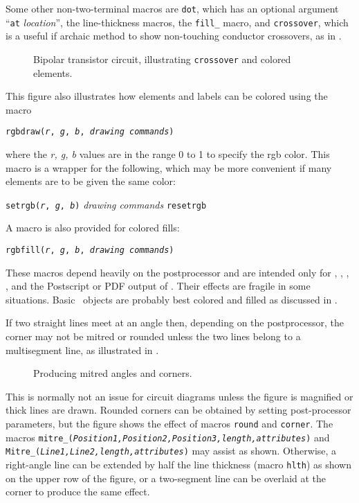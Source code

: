 \pagebreak
Some other non-two-terminal macros are {\tt dot}, which has an
optional argument ``{\tt at} {\sl location}'', the line-thickness
macros, the {\tt fill\_} macro, and {\tt crossover}, which is a useful if
archaic method to show non-touching conductor crossovers, as in
.
\begin{figure}[H]
   
   \caption{Bipolar transistor circuit, illustrating {\tt crossover}
      and colored elements.}
   \label{bistable}
   \end{figure}

This figure also illustrates how elements and labels can be colored
using the macro
\par
{\tt rgbdraw({\sl r}, {\sl g}, {\sl b}, {\sl drawing commands})}
\par
\noindent
where the {\sl r, g, b} values are in the range 0 to 1
to specify the rgb color.
This macro is a wrapper for the following, which may be more convenient
if many elements are to be given the same color:

   {\tt setrgb({\sl r}, {\sl g}, {\sl b})}
      \hfill\break\hspace*{\parindent}%
   {\sl drawing commands}
      \hfill\break\hspace*{\parindent}%
   {\tt resetrgb}

A macro is also provided for colored fills:

{\tt rgbfill({\sl r}, {\sl g}, {\sl b}, {\sl drawing commands})}

\noindent%
These macros depend heavily on the postprocessor and are intended only for 
\PSTricks, \TPGF, \MetaPost, \SVG, and the Postscript or PDF output of \dpic.
Their effects are fragile in some situations.
Basic \Pic\ objects are probably best colored and filled as discussed
in .

%
If two straight lines meet at an angle then, depending on the postprocessor,
the corner may not be mitred or rounded unless the two lines belong to
a multisegment line, as illustrated in .
\begin{figure}[H]
   
   \caption{Producing mitred angles and corners.}
   \label{Corners}
   \end{figure}
This is normally
not an issue for circuit diagrams unless the figure is magnified or thick
lines are drawn.  Rounded corners can be obtained by setting post-processor
parameters, but the figure shows the effect of
macros {\tt round} and {\tt corner}.
The macros
{\tt mitre\_({\sl Position1,Position2,Position3,length,attributes})}
and
{\tt Mitre\_({\sl Line1,Line2,length,attributes})}
may assist as shown.
Otherwise, a right-angle line can be extended
by half the line thickness (macro {\tt hlth}) as shown on the upper row
of the figure,
or a two-segment line can be overlaid at the corner to produce the same effect.

